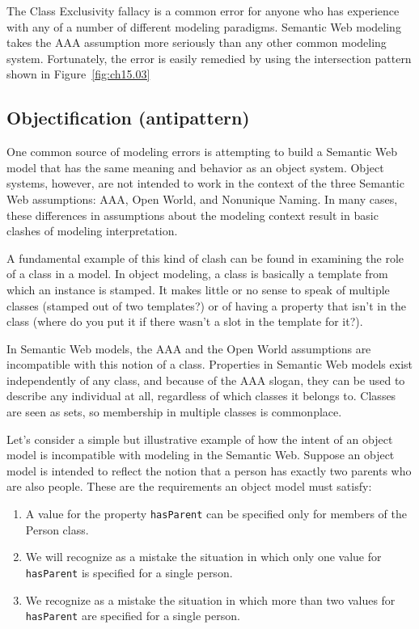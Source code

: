 The Class Exclusivity fallacy is a common error for anyone who has
experience with any of a number of different modeling paradigms.
Semantic Web modeling takes the AAA assumption more seriously than any
other common modeling system. Fortunately, the error is easily remedied
by using the intersection pattern shown in Figure~\ref{fig:ch15.03}

\subsection{Objectification (antipattern)}

One common source of modeling errors is attempting to build a Semantic
Web model that has the same meaning and behavior as an object system.
Object systems, however, are not intended to work in the context of the
three Semantic Web assumptions: AAA, Open World, and Nonunique Naming.
In many cases, these differences in assumptions about the modeling
context result in basic clashes of modeling interpretation.

A fundamental example of this kind of clash can be found in examining
the role of a class in
a model. In object modeling, a class is basically a template from which
an instance is stamped. It makes little or no sense to speak of multiple
classes (stamped out of two templates?) or of having a property that
isn't in the class (where do you put it if there wasn't a slot in the
template for it?).

In Semantic Web models, the AAA and the Open World assumptions are
incompatible with this notion of a class. Properties in Semantic Web
models exist independently of any class, and because of the AAA slogan,
they can be used to describe any individual at all, regardless of which
classes it belongs to. Classes are seen as sets, so membership in
multiple classes is commonplace.

Let's consider a simple but illustrative example of how the intent of an
object model is incompatible with modeling in the Semantic Web. Suppose
an object model is intended to reflect the notion that a person has
exactly two parents who are also people. These are the requirements an
object model must satisfy:

\begin{enumerate}
\item A value for the property \texttt{hasParent} can be specified only for members
of the Person class.

\item  We will recognize as a mistake the situation in which only one value
for \texttt{hasParent} is specified for a single person.

\item  We recognize as a mistake the situation in which more than two values
for \texttt{hasParent} are specified for a single person.
\end{enumerate}


